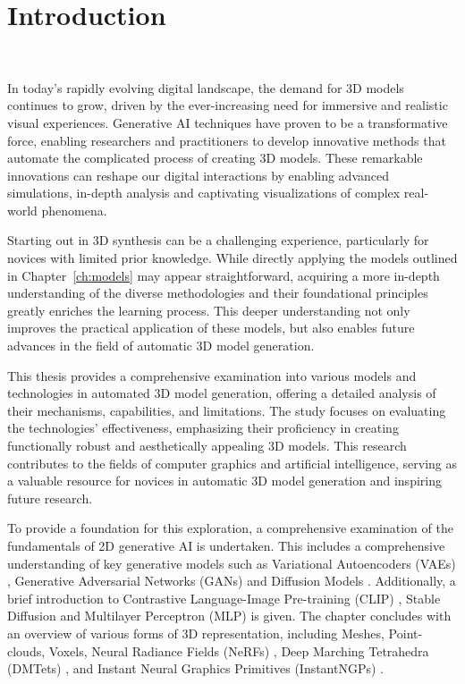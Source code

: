 \chapter{Introduction}~\label{ch:introduction}

In today's rapidly evolving digital landscape, the demand for 3D models continues to grow, driven by the ever-increasing need for immersive and realistic visual experiences. Generative AI techniques have proven to be a transformative force, enabling researchers and practitioners to develop innovative methods that automate the complicated process of creating 3D models. These remarkable innovations can reshape our digital interactions by enabling advanced simulations, in-depth analysis and captivating visualizations of complex real-world phenomena.

Starting out in 3D synthesis can be a challenging experience, particularly for novices with limited prior knowledge. While directly applying the models outlined in Chapter~\ref{ch:models} may appear straightforward, acquiring a more in-depth understanding of the diverse methodologies and their foundational principles greatly enriches the learning process. This deeper understanding not only improves the practical application of these models, but also enables future advances in the field of automatic 3D model generation.

This thesis provides a comprehensive examination into various models and technologies in automated 3D model generation, offering a detailed analysis of their mechanisms, capabilities, and limitations. The study focuses on evaluating the technologies' effectiveness, emphasizing their proficiency in creating functionally robust and aesthetically appealing 3D models. This research contributes to the fields of computer graphics and artificial intelligence, serving as a valuable resource for novices in automatic 3D model generation and inspiring future research.

To provide a foundation for this exploration, a comprehensive examination of the fundamentals of 2D generative AI is undertaken. This includes a comprehensive understanding of key generative models such as Variational Autoencoders (VAEs) \citep{kingmaVAE,rezendeVAE}, Generative Adversarial Networks (GANs) \citep{goodfellowGAN} and Diffusion Models \citep{yangdiffusionSummary,hoDDPMs, sohlDDPM}. Additionally, a brief introduction to Contrastive Language-Image Pre-training (CLIP) \citep{radfordCLIP}, Stable Diffusion \citep{rombachStableDiffusion} and Multilayer Perceptron (MLP) is given. The chapter concludes with an overview of various forms of 3D representation, including Meshes, Point-clouds, Voxels, Neural Radiance Fields (NeRFs) \citep{mildenhallNERF}, Deep Marching Tetrahedra (DMTets) \citep{shen2021DMTet}, and Instant Neural Graphics Primitives (InstantNGPs) \citep{M_ller_2022}.

